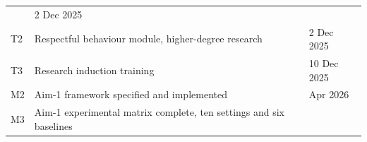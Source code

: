\documentclass[
  11pt,
]{article}
\begin{document}
\begin{longtable}[]{@{}llll@{}}
\begin{minipage}[t]{0.19\columnwidth}
\strut
\end{minipage} & \begin{minipage}[t]{0.15\columnwidth}\raggedright
2 Dec 2025\strut
\end{minipage}\tabularnewline
\begin{minipage}[t]{0.06\columnwidth}\raggedright
T2\strut
\end{minipage} & \begin{minipage}[t]{0.49\columnwidth}\raggedright
Respectful behaviour module, higher-degree research\strut
\end{minipage} & \begin{minipage}[t]{0.19\columnwidth}\raggedright
\strut
\end{minipage} & \begin{minipage}[t]{0.15\columnwidth}\raggedright
2 Dec 2025\strut
\end{minipage}\tabularnewline
\begin{minipage}[t]{0.06\columnwidth}\raggedright
T3\strut
\end{minipage} & \begin{minipage}[t]{0.49\columnwidth}\raggedright
Research induction training\strut
\end{minipage} & \begin{minipage}[t]{0.19\columnwidth}\raggedright
\strut
\end{minipage} & \begin{minipage}[t]{0.15\columnwidth}\raggedright
10 Dec 2025\strut
\end{minipage}\tabularnewline
\begin{minipage}[t]{0.06\columnwidth}\raggedright
M2\strut
\end{minipage} & \begin{minipage}[t]{0.49\columnwidth}\raggedright
Aim-1 framework specified and implemented\strut
\end{minipage} & \begin{minipage}[t]{0.19\columnwidth}\raggedright
\strut
\end{minipage} & \begin{minipage}[t]{0.15\columnwidth}\raggedright
Apr 2026\strut
\end{minipage}\tabularnewline
\begin{minipage}[t]{0.06\columnwidth}\raggedright
M3\strut
\end{minipage} & \begin{minipage}[t]{0.49\columnwidth}\raggedright
Aim-1 experimental matrix complete, ten settings and six baselines\strut

\end{minipage}
\end{longtable}
\end{document}
